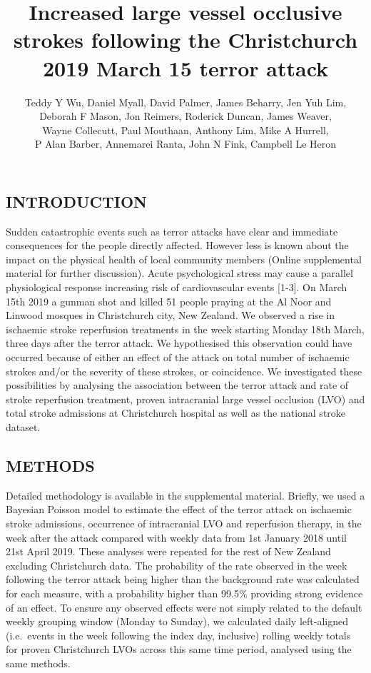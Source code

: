 \documentclass[
]{article}
\title{Increased large vessel occlusive strokes following the
Christchurch 2019 March 15 terror attack}
\author{Teddy Y Wu, Daniel Myall, David Palmer, James Beharry, Jen Yuh
Lim,\\
Deborah F Mason, Jon Reimers, Roderick Duncan, James Weaver,\\
Wayne Collecutt, Paul Mouthaan, Anthony Lim, Mike A Hurrell,\\
P Alan Barber, Annemarei Ranta, John N Fink, Campbell Le Heron}
\date{}
\begin{document}
\maketitle

\hypertarget{introduction}{%
\subsection{INTRODUCTION}\label{introduction}}

Sudden catastrophic events such as terror attacks have clear and
immediate consequences for the people directly affected. However less is
known about the impact on the physical health of local community members
(Online supplemental material for further discussion). Acute
psychological stress may cause a parallel physiological response
increasing risk of cardiovascular events {[}1-3{]}. On March 15th 2019 a
gunman shot and killed 51 people praying at the Al Noor and Linwood
mosques in Christchurch city, New Zealand. We observed a rise in
ischaemic stroke reperfusion treatments in the week starting Monday 18th
March, three days after the terror attack. We hypothesised this
observation could have occurred because of either an effect of the
attack on total number of ischaemic strokes and/or the severity of these
strokes, or coincidence. We investigated these possibilities by
analysing the association between the terror attack and rate of stroke
reperfusion treatment, proven intracranial large vessel occlusion (LVO)
and total stroke admissions at Christchurch hospital as well as the
national stroke dataset.

\hypertarget{methods}{%
\subsection{METHODS}\label{methods}}

Detailed methodology is available in the supplemental material. Briefly,
we used a Bayesian Poisson model to estimate the effect of the terror
attack on ischaemic stroke admissions, occurrence of intracranial LVO
and reperfusion therapy, in the week after the attack compared with
weekly data from 1st January 2018 until 21st April 2019. These analyses
were repeated for the rest of New Zealand excluding Christchurch data.
The probability of the rate observed in the week following the terror
attack being higher than the background rate was calculated for each
measure, with a probability higher than 99.5\% providing strong evidence
of an effect. To ensure any observed effects were not simply related to
the default weekly grouping window (Monday to Sunday), we calculated
daily left-aligned (i.e.~events in the week following the index day,
inclusive) rolling weekly totals for proven Christchurch LVOs across
this same time period, analysed using the same methods.
\end{document}
